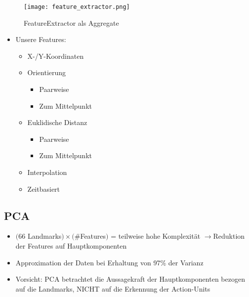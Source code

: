 \documentclass{beamer}
\begin{document}
\begin{frame}
\begin{figure}
    \texttt{[image: feature\_extractor.png]}
    \caption{FeatureExtractor als Aggregate}
    \end{figure}
\end{frame}

\begin{frame}
\begin{itemize}
  \item Unsere Features:
    \begin{itemize}
      \item X-/Y-Koordinaten
      \item Orientierung
        \begin{itemize}
          \item Paarweise
          \item Zum Mittelpunkt
        \end{itemize}
      \item Euklidische Distanz
        \begin{itemize}
          \item Paarweise
          \item Zum Mittelpunkt
        \end{itemize}
      \item Interpolation
      \item Zeitbasiert
    \end{itemize}
  \end{itemize}
\end{frame}

\subsection{PCA}
\begin{frame}
  \begin{itemize}
    \item $($66 Landmarks$) \times ($\#Features$)$ = teilweise hohe Komplexität\newline
          $\rightarrow$Reduktion der Features auf Hauptkomponenten
    \item Approximation der Daten bei Erhaltung von 97\% der Varianz
    \item Vorsicht: PCA betrachtet die Aussagekraft der Hauptkomponenten bezogen auf die Landmarks, NICHT auf die Erkennung der Action-Units
  \end{itemize}
\end{frame}
\end{document}
